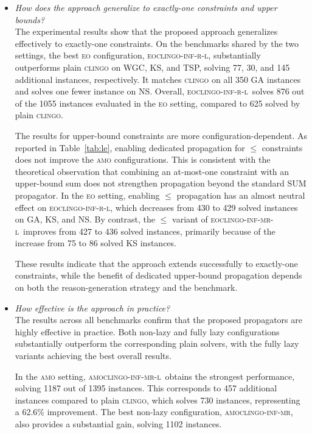 \documentclass[preprint,authoryear]{elsarticle}
\newcommand{\amoclingoinfmr}{\textsc{amoclingo-inf-mr}\xspace}
\newcommand{\amoclingoinfmrlazy}{\textsc{amoclingo-inf-mr-l}\xspace}
\newcommand{\eoclingoinfrlazy}{\textsc{eoclingo-inf-r-l}\xspace}
\newcommand{\eoclingoinfmrlazy}{\textsc{eoclingo-inf-mr-l}\xspace}
\theoremstyle{definition}
\begin{document}
{\begin{itemize}
\item[\textit{Q5}] \emph{How does the approach generalize to exactly-one constraints and upper bounds?}\\
The experimental results show that the proposed approach generalizes effectively to exactly-one constraints. On the benchmarks shared by the two settings, the best \textsc{eo} configuration, \eoclingoinfrlazy, substantially outperforms plain \textsc{clingo} on WGC, KS, and TSP, solving 77, 30, and 145 additional instances, respectively. It matches \textsc{clingo} on all 350 GA instances and solves one fewer instance on NS. Overall, \eoclingoinfrlazy\ solves 876 out of the 1055 instances evaluated in the \textsc{eo} setting, compared to 625 solved by plain \textsc{clingo}.

The results for upper-bound constraints are more configuration-dependent. As reported in Table~\ref{tab:le}, enabling dedicated propagation for $\le$ constraints does not improve the \textsc{amo} configurations. This is consistent with the theoretical observation that combining an at-most-one constraint with an upper-bound sum does not strengthen propagation beyond the standard SUM propagator. In the \textsc{eo} setting, enabling $\le$ propagation has an almost neutral effect on \eoclingoinfrlazy, which decreases from 430 to 429 solved instances on GA, KS, and NS. By contrast, the $\le$ variant of \eoclingoinfmrlazy\ improves from 427 to 436 solved instances, primarily because of the increase from 75 to 86 solved KS instances.

These results indicate that the approach extends successfully to exactly-one constraints, while the benefit of dedicated upper-bound propagation depends on both the reason-generation strategy and the benchmark.

\item[\textit{Q6}] \emph{How effective is the approach in practice?}\\
The results across all benchmarks confirm that the proposed propagators are highly effective in practice. Both non-lazy and fully lazy configurations substantially outperform the corresponding plain solvers, with the fully lazy variants achieving the best overall results.

In the \textsc{amo} setting, \amoclingoinfmrlazy\ obtains the strongest performance, solving 1187 out of 1395 instances. This corresponds to 457 additional instances compared to plain \textsc{clingo}, which solves 730 instances, representing a 62.6\% improvement. The best non-lazy configuration, \amoclingoinfmr, also provides a substantial gain, solving 1102 instances.


\end{itemize}}
\end{document}
